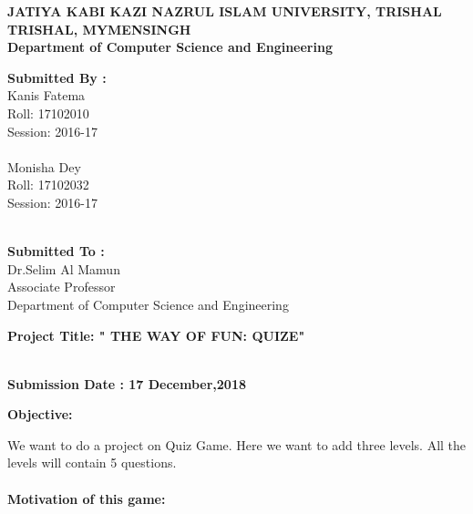 \documentclass{article}
\begin{document}
	\begin{center}
	 \textbf{{JATIYA KABI KAZI NAZRUL ISLAM UNIVERSITY, TRISHAL}} \\
	 \vspace{2mm}
	 \textbf{ TRISHAL, MYMENSINGH} \\
	 \vspace{2mm}
	\textbf{{Department of Computer Science and Engineering}} \\
	
		
	
	\end{center}
	\vspace{25mm}
	\huge\textbf{{Submitted By :}}\\
	\large{Kanis Fatema  \\ Roll: 17102010\\ Session: 2016-17 \\ \\	                                                            
	Monisha Dey\\Roll: 17102032\\Session: 2016-17}\\\\
	\vspace{20mm}
		\begin{flushright}
	\huge\textbf{{Submitted To :}}\\
	\large{Dr.Selim Al Mamun  \\ Associate Professor\\Department of Computer Science and Engineering }\\
	\end{flushright}
\vspace{25mm}


\textbf{{Project Title: " THE WAY OF FUN: QUIZE" }}\\\\

\begin{center}
	\textbf{{Submission Date : 17 December,2018}} \\
	
\end{center}
\vspace{55mm}
	\huge\textbf{{Objective:}}
	
	
	\large{We want to do a project on Quiz Game. Here we want to add three levels. All the levels will contain 5 questions. }	\\\\
	\huge\textbf{{Motivation of this game:}}
\end{document}
